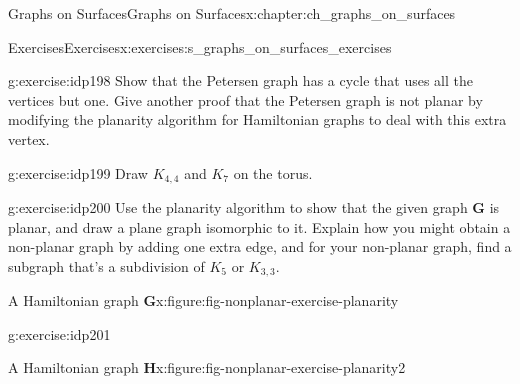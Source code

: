 \documentclass[oneside,10pt,]{book}
\numberwithin{equation}{section}
\newcommand{\bfG}{\mathbf{G}}
\newcommand{\bfH}{\mathbf{H}}
\begin{document}
\begin{chapterptx}{Graphs on Surfaces}{}{Graphs on Surfaces}{}{}{x:chapter:ch_graphs_on_surfaces}
\typeout{************************************************}
%
\begin{exercises-section}{Exercises}{}{Exercises}{}{}{x:exercises:s_graphs_on_surfaces_exercises}
\begin{divisionexercise}{1}{}{}{g:exercise:idp198}%
Show that the Petersen graph has a cycle that uses all the vertices but one.  Give another proof that the Petersen graph is not planar by modifying the planarity algorithm for Hamiltonian graphs to deal with this extra vertex.\end{divisionexercise}%
\begin{divisionexercise}{2}{}{}{g:exercise:idp199}%
Draw \(K_{4,4}\) and \(K_7\) on the torus.\end{divisionexercise}%
\begin{divisionexercise}{3}{}{}{g:exercise:idp200}%
Use the planarity algorithm to show that the given graph \(\bfG\) is planar, and draw a plane graph isomorphic to it.  Explain how you might obtain a non-planar graph by adding one extra edge, and for your non-planar graph, find a subgraph that's a subdivision of \(K_5\) or \(K_{3,3}\). \begin{figureptx}{A Hamiltonian graph \(\bfG\)}{x:figure:fig-nonplanar-exercise-planarity}{}%
\begin{image}{0.15}{0.7}{0.15}%
%
\end{image}%
\tcblower
\end{figureptx}%
\end{divisionexercise}%
\begin{divisionexercise}{4}{}{}{g:exercise:idp201}%
\begin{figureptx}{A Hamiltonian graph \(\bfH\)}{x:figure:fig-nonplanar-exercise-planarity2}{}%
\begin{image}{0.15}{0.7}{0.15}%
\end{image}
\end{figureptx}
\end{divisionexercise}
\end{exercises-section}
\end{chapterptx}
\end{document}
